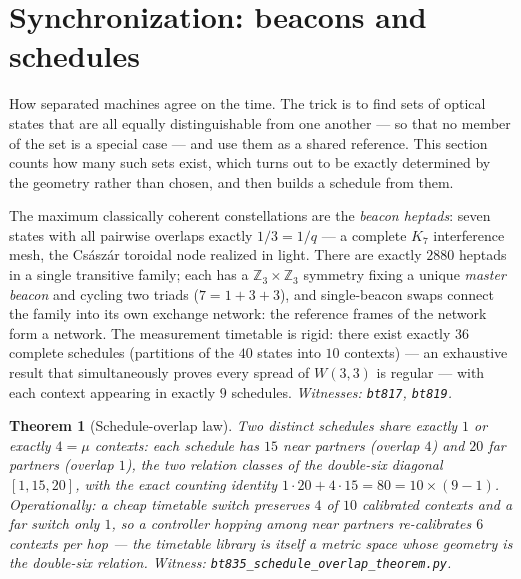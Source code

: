 \documentclass[11pt]{article}
\newtheorem{theorem}{Theorem}[section]
\newcommand{\W}{W(3,3)}
\begin{document}
\section{Synchronization: beacons and schedules}

\begin{plainbox}
How separated machines agree on the time. The trick is to find sets of optical
states that are all equally distinguishable from one another --- so that no member of the
set is a special case --- and use them as a shared reference. This section counts how many
such sets exist, which turns out to be exactly determined by the geometry rather than
chosen, and then builds a schedule from them.
\end{plainbox}

\label{sec:sync}

The maximum classically coherent constellations are the
\emph{beacon heptads}: seven states with all pairwise overlaps exactly
$1/3=1/q$ --- a complete $K_7$ interference mesh, the Cs\'asz\'ar
toroidal node realized in light.  There are exactly $2880$ heptads in
a single transitive family; each has a $\mathbb{Z}_3\times\mathbb{Z}_3$
symmetry fixing a unique \emph{master beacon} and cycling two triads
($7=1+3+3$), and single-beacon swaps connect the family into its own
exchange network: the reference frames of the network form a network.
The measurement timetable is rigid: there exist exactly $36$ complete
schedules (partitions of the $40$ states into $10$ contexts) --- an
exhaustive result that simultaneously proves every spread of $\W$ is
regular --- with each context appearing in exactly $9$ schedules.
\emph{Witnesses: \texttt{bt817}, \texttt{bt819}.}

\begin{theorem}[Schedule-overlap law]
Two distinct schedules share exactly $1$ or exactly $4=\mu$ contexts:
each schedule has $15$ \emph{near} partners (overlap $4$) and $20$
\emph{far} partners (overlap $1$), the two relation classes of the
double-six diagonal $[1,15,20]$, with the exact counting identity
$1\cdot 20 + 4\cdot 15 = 80 = 10\times(9-1)$.  Operationally: a cheap
timetable switch preserves $4$ of $10$ calibrated contexts and a far
switch only $1$, so a controller hopping among near partners
re-calibrates $6$ contexts per hop --- the timetable library is itself
a metric space whose geometry is the double-six relation.
\emph{Witness: \texttt{bt835\_schedule\_overlap\_theorem.py}.}
\end{theorem}
\end{document}
